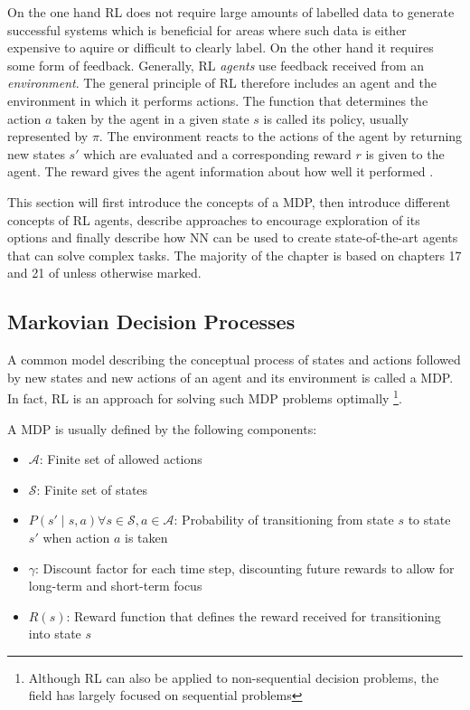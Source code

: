 On the one hand \ac {RL}  does not require large amounts of labelled data to generate successful systems which is
beneficial for areas where such data is either expensive to aquire or difficult to clearly label. On the other hand it
requires some form of feedback. Generally, \ac {RL} \emph{agents} use feedback received from an \emph{environment}.  The
general principle of \ac {RL} therefore includes an agent and the environment in which it performs actions. The function
that determines the action $a$  taken by the agent in a given state $s$ is called its policy, usually represented by
$\pi$.  The environment reacts to the actions of the agent by returning new states $s'$ which are evaluated and a
corresponding reward $r$ is given to the agent. The reward gives the agent information about how well it performed 
\citep[p.830f.]{russell2016artificial}.

This section will first introduce the concepts of a \ac {MDP}, then introduce different concepts of \ac {RL} agents,
describe approaches to encourage exploration of its options and finally describe how \ac {NN} can be used to create
state-of-the-art agents that can solve complex tasks. The majority of the chapter is based on
chapters 17 and 21 of \citet[]{russell2016artificial} unless otherwise marked. 

\subsection{Markovian Decision Processes}%
\label{ssub:markovian_decision_processes}

A common model describing the conceptual process of states and actions followed by new states and new actions of an
agent and its environment is called a \acf {MDP}. In fact, \ac {RL} is an approach for solving such \ac {MDP} problems
optimally
\footnote{Although \ac {RL} can also be applied to non-sequential decision problems, the field has largely focused on
sequential problems}.

A \ac {MDP} is usually defined by the following components:

\begin{itemize}
	\item $\mathcal{A}$: Finite set of allowed actions  
	\item $\mathcal{S}$: Finite set of states
	\item $P(s' \mid s,a) \forall s \in \mathcal{S}, a \in \mathcal{A}$: Probability of transitioning from state
	$s$ to state $s'$ when action $a$ is taken
	\item $\gamma$: Discount factor for each time step, discounting future rewards to allow for long-term and
		short-term focus
	\item $R(s)$: Reward function that defines the reward received for transitioning into state $s$
\end{itemize}

